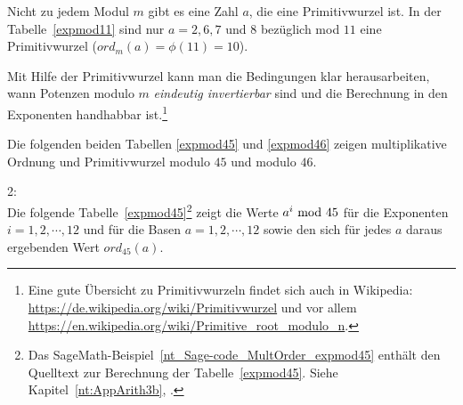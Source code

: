 \begin{refsegment}
Nicht zu jedem Modul $m$ gibt es eine Zahl $a$, die eine
Primitivwurzel ist. %
In der Tabelle~\ref{expmod11} sind nur $a = 2, 6, 7$ und $8$ bezüglich mod
$11$ eine Primitivwurzel ($ord_m(a) = \phi(11) = 10$).

Mit Hilfe der Primitivwurzel kann man die Bedingungen
klar herausarbeiten, wann Potenzen modulo $m$ {\em eindeutig invertierbar}
 sind und die Berechnung in den Exponenten handhabbar
ist.\footnote{%
  Eine gute Übersicht zu Primitivwurzeln findet sich auch in Wikipedia:
  \url{https://de.wikipedia.org/wiki/Primitivwurzel} und vor allem
  \url{https://en.wikipedia.org/wiki/Primitive_root_modulo_n}.
}

Die folgenden beiden Tabellen \ref{expmod45} und \ref{expmod46} zeigen
multiplikative Ordnung und Primitivwurzel modulo
$45$ und modulo $46$.

\newpage
\begin{example}{ 2:}\\
Die folgende Tabelle~\ref{expmod45}\footnote{%
  Das SageMath-Beispiel~\ref{nt_Sage-code_MultOrder_expmod45} enthält den
  Quelltext zur Berechnung der Tabelle~\ref{expmod45}.
  Siehe Kapitel~\ref{nt:AppArith3b}, \glqq {}\grqq.}
zeigt die Werte $a^i{\rm ~mod~}45$ für die Exponenten $i = 1, 2, \cdots, 12$
und für die Basen $a = 1, 2, \cdots, 12$ sowie den sich für jedes $a$ daraus
ergebenden Wert $ord_{45}(a)$.
\end{example}


\end{refsegment}
